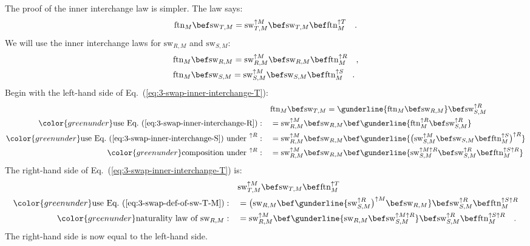 The proof of the inner interchange law is simpler. The law says:
\begin{equation}
\text{ftn}_{M}\bef\text{sw}_{T,M}=\text{sw}_{T,M}^{\uparrow M}\bef\text{sw}_{T,M}\bef\text{ftn}_{M}^{\uparrow T}\quad.\label{eq:3-swap-inner-interchange-T}
\end{equation}
We will use the inner interchange laws for $\text{sw}_{R,M}$ and
$\text{sw}_{S,M}$:
\begin{align}
 & \text{ftn}_{M}\bef\text{sw}_{R,M}=\text{sw}_{R,M}^{\uparrow M}\bef\text{sw}_{R,M}\bef\text{ftn}_{M}^{\uparrow R}\quad,\label{eq:3-swap-inner-interchange-R}\\
 & \text{ftn}_{M}\bef\text{sw}_{S,M}=\text{sw}_{S,M}^{\uparrow M}\bef\text{sw}_{S,M}\bef\text{ftn}_{M}^{\uparrow S}\quad.\label{eq:3-swap-inner-interchange-S}
\end{align}
Begin with the left-hand side of Eq.~(\ref{eq:3-swap-inner-interchange-T}):
\begin{align*}
 & \text{ftn}_{M}\bef\text{sw}_{T,M}=\gunderline{\text{ftn}_{M}\bef\text{sw}_{R,M}}\bef\text{sw}_{S,M}^{\uparrow R}\\
{\color{greenunder}\text{use Eq.~(\ref{eq:3-swap-inner-interchange-R})}:}\quad & =\text{sw}_{R,M}^{\uparrow M}\bef\text{sw}_{R,M}\bef\gunderline{\text{ftn}_{M}^{\uparrow R}\bef\text{sw}_{S,M}^{\uparrow R}}\\
{\color{greenunder}\text{use Eq.~(\ref{eq:3-swap-inner-interchange-S}) under }^{\uparrow R}:}\quad & =\text{sw}_{R,M}^{\uparrow M}\bef\text{sw}_{R,M}\bef\gunderline{\big(\text{sw}_{S,M}^{\uparrow M}\bef\text{sw}_{S,M}\bef\text{ftn}_{M}^{\uparrow S}\big)^{\uparrow R}}\\
{\color{greenunder}\text{composition under }^{\uparrow R}:}\quad & =\text{sw}_{R,M}^{\uparrow M}\bef\text{sw}_{R,M}\bef\gunderline{\text{sw}_{S,M}^{\uparrow M\uparrow R}\bef\text{sw}_{S,M}^{\uparrow R}\bef\text{ftn}_{M}^{\uparrow S\uparrow R}}
\end{align*}
The right-hand side of Eq.~(\ref{eq:3-swap-inner-interchange-T})
is:
\begin{align*}
 & \text{sw}_{T,M}^{\uparrow M}\bef\text{sw}_{T,M}\bef\text{ftn}_{M}^{\uparrow T}\\
{\color{greenunder}\text{use Eq.~(\ref{eq:3-swap-def-of-sw-T-M})}:}\quad & =\big(\text{sw}_{R,M}\bef\gunderline{\text{sw}_{S,M}^{\uparrow R}\big)^{\uparrow M}\bef\text{sw}_{R,M}}\bef\text{sw}_{S,M}^{\uparrow R}\bef\text{ftn}_{M}^{\uparrow S\uparrow R}\\
{\color{greenunder}\text{naturality law of }\text{sw}_{R,M}:}\quad & =\text{sw}_{R,M}^{\uparrow M}\bef\gunderline{\text{sw}_{R,M}\bef\text{sw}_{S,M}^{\uparrow M\uparrow R}}\bef\text{sw}_{S,M}^{\uparrow R}\bef\text{ftn}_{M}^{\uparrow S\uparrow R}\quad.
\end{align*}
The right-hand side is now equal to the left-hand side.

